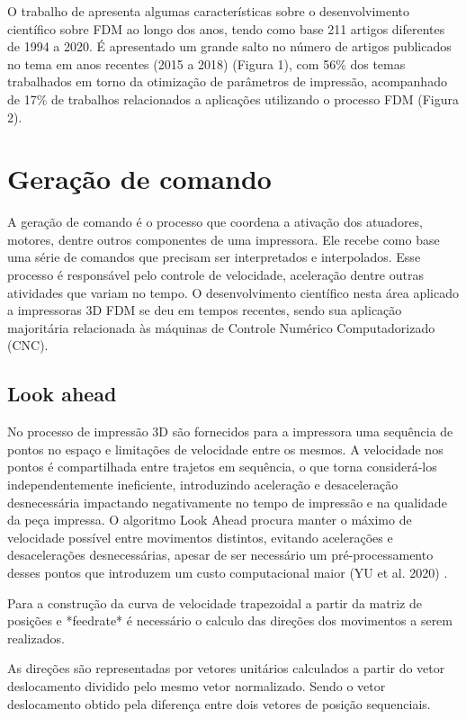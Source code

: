 O trabalho de \cite{vyavahare20} apresenta algumas 
características sobre o desenvolvimento científico sobre 
FDM ao longo dos anos, tendo como base 211 artigos diferentes 
de 1994 a 2020. É apresentado um grande salto no número de 
artigos publicados no tema em anos recentes (2015 a 2018) 
(Figura 1), com 56\% dos temas trabalhados em torno da 
otimização de parâmetros de impressão, acompanhado de 17\% de 
trabalhos relacionados a aplicações utilizando o processo FDM 
(Figura 2).

\section{Geração de comando}
A geração de comando é o processo que coordena a ativação dos 
atuadores, motores, dentre outros componentes de uma impressora. 
Ele recebe como base uma série de comandos que precisam ser 
interpretados e interpolados. Esse processo é responsável pelo 
controle de velocidade, aceleração dentre outras atividades que 
variam no tempo. O desenvolvimento científico nesta área 
aplicado a impressoras 3D FDM se deu em tempos recentes, 
sendo sua aplicação majoritária relacionada às máquinas de 
Controle Numérico Computadorizado (CNC).

\subsection{Look ahead}
No processo de impressão 3D são fornecidos para a impressora 
uma sequência de pontos no espaço e limitações de velocidade 
entre os mesmos. A velocidade nos pontos é compartilhada entre 
trajetos em sequência, o que torna considerá-los 
independentemente ineficiente, introduzindo aceleração e 
desaceleração desnecessária impactando negativamente no tempo 
de impressão e na qualidade da peça impressa.
O algoritmo Look Ahead procura manter o máximo de velocidade 
possível entre movimentos distintos, evitando acelerações e 
desacelerações desnecessárias, apesar de ser necessário um 
pré-processamento desses pontos que introduzem um custo 
computacional maior (YU et al. 2020) \cite{yu20}.


Para a construção da curva de velocidade trapezoidal a partir da matriz de posições
e *feedrate* é necessário o calculo das direções dos movimentos a serem realizados.

As direções são representadas por vetores unitários calculados a partir
do vetor deslocamento dividido pelo mesmo vetor normalizado. Sendo o vetor deslocamento
obtido pela diferença entre dois vetores de posição sequenciais.

